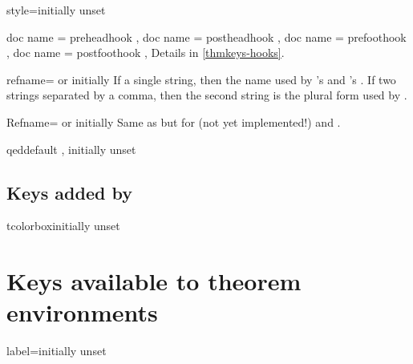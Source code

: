 \documentclass{ltxdoc}
\begin{document}
\begin{docKey}{style}{=}{initially unset}

\end{docKey}

\begin{docKeys}[
  doc parameter = {=\meta{code}},
  doc description = initially unset,
  ]
  {
	{ doc name = preheadhook },
	{ doc name = postheadhook },
	{ doc name = prefoothook },
	{ doc name = postfoothook },
  }
Details in \autoref{thmkeys-hooks}.
\end{docKeys}

\begin{docKey}{refname}{= or }{initially }
If a single string, then the name used by 's  and 's . If two strings separated by a comma, then the second string is the plural form used by .
\end{docKey}

\begin{docKey}{Refname}{= or }{initially }
Same as  but for  (not yet implemented!) and .
\end{docKey}

\begin{docKey}{qed}{}{default , initially unset}

\end{docKey}

\subsection{Keys added by }

\begin{docKey}{tcolorbox}{}{initially unset}

\end{docKey}

\section{Keys available to theorem environments} \label{in-doc-keys}

\begin{docKey}{label}{=}{initially unset}

\end{docKey}
\end{document}
